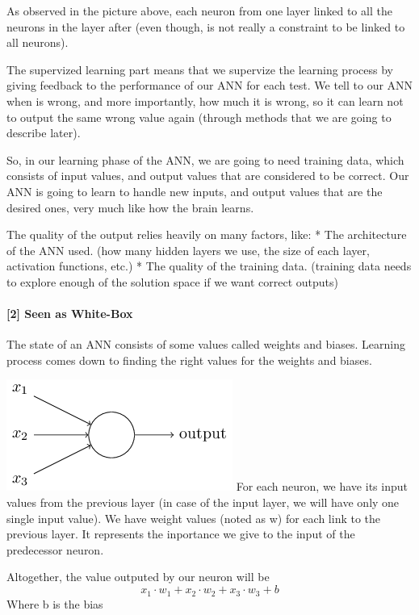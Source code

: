\documentclass[11pt]{article}
\makeatletter
\def\maxwidth{\ifdim\Gin@nat@width>\linewidth\linewidth
    \else\Gin@nat@width\fi}
\let\Oldincludegraphics\includegraphics
\renewcommand{\includegraphics}[1]{\Oldincludegraphics[width=.8\maxwidth]{#1}}
\makeatother
\begin{document}
As observed in the picture above, each neuron from one layer linked to
all the neurons in the layer after (even though, is not really a
constraint to be linked to all neurons).

The supervized learning part means that we supervize the learning
process by giving feedback to the performance of our ANN for each test.
We tell to our ANN when is wrong, and more importantly, how much it is
wrong, so it can learn not to output the same wrong value again (through
methods that we are going to describe later).

So, in our learning phase of the ANN, we are going to need training
data, which consists of input values, and output values that are
considered to be correct. Our ANN is going to learn to handle new
inputs, and output values that are the desired ones, very much like how
the brain learns.

The quality of the output relies heavily on many factors, like: * The
architecture of the ANN used. (how many hidden layers we use, the size
of each layer, activation functions, etc.) * The quality of the training
data. (training data needs to explore enough of the solution space if we
want correct outputs)

\hypertarget{seen-as-white-box}{%
\paragraph{{[}2{]} Seen as White-Box}\label{seen-as-white-box}}

The state of an ANN consists of some values called weights and biases.
Learning process comes down to finding the right values for the weights
and biases.

\includegraphics{gfx/neuron.png} For each neuron, we have its input
values from the previous layer (in case of the input layer, we will have
only one single input value). We have weight values (noted as w) for
each link to the previous layer. It represents the inportance we give to
the input of the predecessor neuron.

Altogether, the value outputed by our neuron will be
\[ x_{1}\cdot w_{1} + x_{2}\cdot w_{2} + x_{3}\cdot w_{3} + b \] Where b
is the bias
\end{document}

